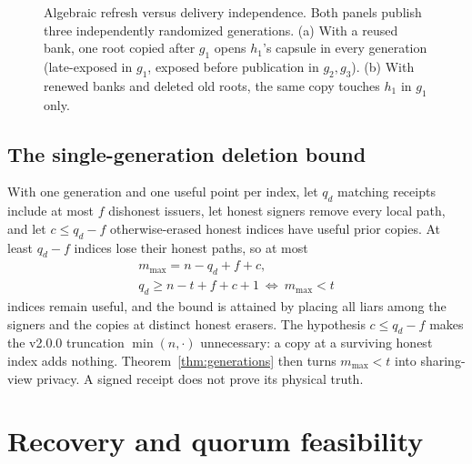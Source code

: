 \documentclass[pdflatex,sn-mathphys-num,twocolumn]{sn-jnl}
\theoremstyle{plain}
\theoremstyle{definition}
\begin{document}
\begin{figure}[t]
\centering
\resizebox{\linewidth}{!}{}
\caption{Algebraic refresh versus delivery independence. Both panels publish three independently randomized generations. (a) With a reused bank, one root copied after $g_1$ opens $h_1$'s capsule in every generation (late-exposed in $g_1$, exposed before publication in $g_2,g_3$). (b) With renewed banks and deleted old roots, the same copy touches $h_1$ in $g_1$ only.}\label{fig:reuse}
\end{figure}

\subsection{The single-generation deletion bound}
With one generation and one useful point per index, let $q_d$ matching receipts include at most $f$ dishonest issuers, let honest signers remove every local path, and let $c\le q_d-f$ otherwise-erased honest indices have useful prior copies. At least $q_d-f$ indices lose their honest paths, so at most
\begin{equation}\label{eq:deletion}
\begin{gathered}
 m_{\max}=n-q_d+f+c,\\
 q_d\ge n-t+f+c+1\ \Longleftrightarrow\ m_{\max}<t
\end{gathered}
\end{equation}
indices remain useful, and the bound is attained by placing all liars among the signers and the copies at distinct honest erasers. The hypothesis $c\le q_d-f$ makes the v2.0.0 truncation $\min(n,\cdot)$ unnecessary: a copy at a surviving honest index adds nothing. Theorem~\ref{thm:generations} then turns $m_{\max}<t$ into sharing-view privacy. A signed receipt does not prove its physical truth.


\section{Recovery and quorum feasibility}\label{sec:quorum}
\end{document}
